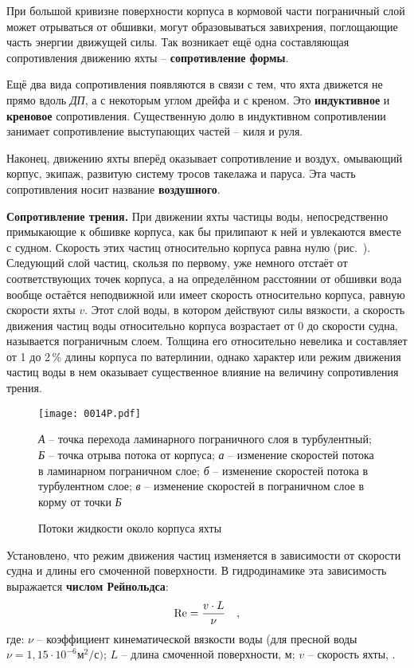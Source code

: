 При большой кривизне поверхности корпуса в кормовой части пограничный
слой может отрываться от обшивки, могут образовываться завихрения,
поглощающие часть энергии движущей силы. Так возникает ещё одна
составляющая сопротивления движению яхты \--- \textbf{сопротивление
  формы}.

Ещё два вида сопротивления появляются в связи с тем, что яхта движется
не прямо вдоль \textit{ДП}, а с некоторым углом дрейфа и с креном. Это
\textbf{индуктивное} и
\textbf{креновое} сопротивления. Существенную
долю в индуктивном сопротивлении занимает сопротивление выступающих
частей \--- киля и руля.

Наконец, движению яхты вперёд оказывает сопротивление и воздух,
омывающий корпус, экипаж, развитую систему тросов такелажа и
паруса. Эта часть сопротивления носит название \textbf{воздушного}.

\textbf{Сопротивление трения.} При
движении яхты частицы воды, непосредственно примыкающие к обшивке
корпуса, как бы прилипают к ней и увлекаются вместе с судном. Скорость
этих частиц относительно корпуса равна нулю (рис.~). Следующий
слой частиц, скользя по первому, уже немного отстаёт от
соответствующих точек корпуса, а на определённом расстоянии от обшивки
вода вообще остаётся неподвижной или имеет скорость относительно
корпуса, равную скорости яхты $v$. Этот слой воды, в котором действуют
силы вязкости, а скорость движения частиц воды относительно корпуса
возрастает от 0 до скорости судна, называется пограничным
слоем. Толщина его относительно невелика и составляет от 1 до 2\,\%
длины корпуса по ватерлинии, однако характер или режим движения частиц
воды в нем оказывает существенное влияние на величину сопротивления
трения.

\begin{figure*}[!htb]
  \centering
  \texttt{[image: 0014P.pdf]}
  \caption{Потоки жидкости около корпуса яхты}
  \label{fig:14}
  \small
  \centering{}
  \textit{А} \--- точка перехода ламинарного пограничного слоя в турбулентный; \textit{Б} \--- точка отрыва потока от корпуса; \textit{а} \--- изменение скоростей потока в ламинарном пограничном слое; \textit{б} \--- изменение скоростей потока в турбулентном слое; \textit{в} \--- изменение скоростей в пограничном слое в корму от точки \textit{Б}
\end{figure*}

Установлено, что режим движения частиц изменяется в зависимости от
скорости судна и длины его смоченной поверхности. В гидродинамике эта
зависимость выражается \textbf{числом
Рейнольдса}:
%
\begin{equation}
  \mathrm {Re} = \frac{v \cdot L}{\nu} \quad , 
\end{equation}
%
где: $\nu$ \--- коэффициент кинематической вязкости воды (для пресной
воды $\nu = 1,15 \cdot 10^{-6} \text{м}^2/\text{с})$; $L$ \--- длина
смоченной поверхности, м; $v$ \--- скорость яхты, \speedms.

